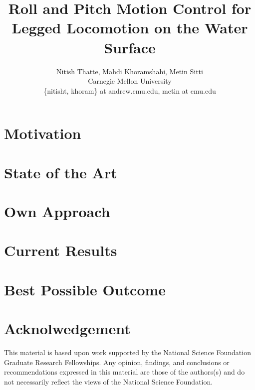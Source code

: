 \documentclass[letterpaper,twocolumn]{article}
\title{Roll and Pitch Motion Control for Legged Locomotion on the Water Surface}
\author{\small Nitish Thatte, Mahdi Khoramshahi, Metin Sitti \\
        \small Carnegie Mellon University \\
        \small \{nitisht, khoram\} at andrew.cmu.edu, metin at cmu.edu
}
\date{}
\begin{document}
\maketitle

\section{Motivation}

\section{State of the Art}

\section{Own Approach}

\section{Current Results}

\section{Best Possible Outcome}

\section*{Acknolwedgement}
This material is based upon work supported by the National Science Foundation Graduate Research Fellowships. Any opinion, findings, and conclusions or recommendations expressed in this material are those of the authors(s) and do not necessarily reflect the views of the National Science Foundation.



\end{document}
